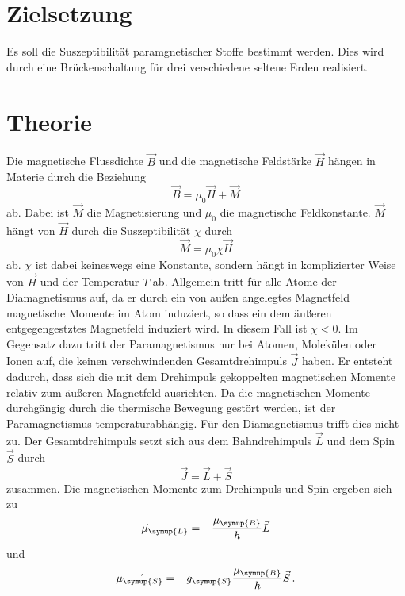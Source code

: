 \section{Zielsetzung}
\label{sec:Zielsetzung}
Es soll die Suszeptibilität paramgnetischer Stoffe bestimmt werden. Dies wird durch eine Brückenschaltung für
drei verschiedene seltene Erden realisiert.

\section{Theorie}
\label{sec:Theorie}
Die magnetische Flussdichte $\vec{B}$ und die magnetische Feldstärke $\vec{H}$ hängen in Materie durch die
Beziehung
\begin{equation}
    \vec{B} = \mu_{0}\vec{H}+\vec{M}
\end{equation}
ab. Dabei ist $\vec{M}$ die Magnetisierung und $\mu_{0}$ die magnetische Feldkonstante. $\vec{M}$ hängt von
$\vec{H}$ durch die Suszeptibilität $\chi$ durch
\begin{equation}
    \vec{M} = \mu_{0}\chi\vec{H}
\end{equation}
ab. $\chi$ ist dabei keineswegs eine Konstante, sondern hängt in komplizierter Weise von $\vec{H}$ und der
Temperatur $T$ ab. Allgemein tritt für alle Atome der Diamagnetismus auf, da er durch ein von außen angelegtes
Magnetfeld magnetische Momente im Atom induziert, so dass ein dem äußeren entgegengestztes Magnetfeld induziert
wird. In diesem Fall ist $\chi < 0$. Im Gegensatz dazu tritt der Paramagnetismus nur bei Atomen, Molekülen oder
Ionen auf, die keinen verschwindenden Gesamtdrehimpuls $\vec{J}$ haben. Er entsteht dadurch, dass sich die mit
dem Drehimpuls gekoppelten magnetischen Momente relativ zum äußeren Magnetfeld ausrichten. Da die magnetischen
Momente durchgängig durch die thermische Bewegung gestört werden, ist der Paramagnetismus temperaturabhängig.
Für den Diamagnetismus trifft dies nicht zu. Der Gesamtdrehimpuls setzt sich aus dem Bahndrehimpuls $\vec{L}$
und dem Spin $\vec{S}$ durch
\begin{equation}
    \vec{J} = \vec{L} + \vec{S}
\end{equation}
zusammen. Die magnetischen Momente zum Drehimpuls und Spin ergeben sich zu
\begin{equation}
    \vec{\mu}_{\symup{L}} = -\frac{\mu_{\symup{B}}}{\hbar} \vec{L}
\end{equation}
und
\begin{equation}
    \vec{\mu_{\symup{S}}} =  -g_{\symup{S}}\frac{\mu_{\symup{B}}}{\hbar}\vec{S}\,.
\end{equation}
